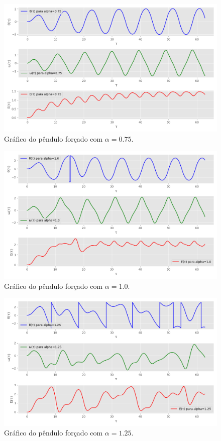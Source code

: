 \documentclass[12pt,a4paper]{article}
\begin{document}
\begin{figure}[H]
\centering
\includegraphics[width=\textwidth]{../tarefa-4a/graficos_alpha_0.75.png}
\caption{Gráfico do pêndulo forçado com $\alpha = 0.75$.}
\end{figure}

\begin{figure}[H]
\centering
\includegraphics[width=\textwidth]{../tarefa-4a/graficos_alpha_1.0.png}
\caption{Gráfico do pêndulo forçado com $\alpha = 1.0$.}
\end{figure}

\begin{figure}[H]
\centering
\includegraphics[width=\textwidth]{../tarefa-4a/graficos_alpha_1.25.png}
\caption{Gráfico do pêndulo forçado com $\alpha = 1.25$.}
\end{figure}
\end{document}
